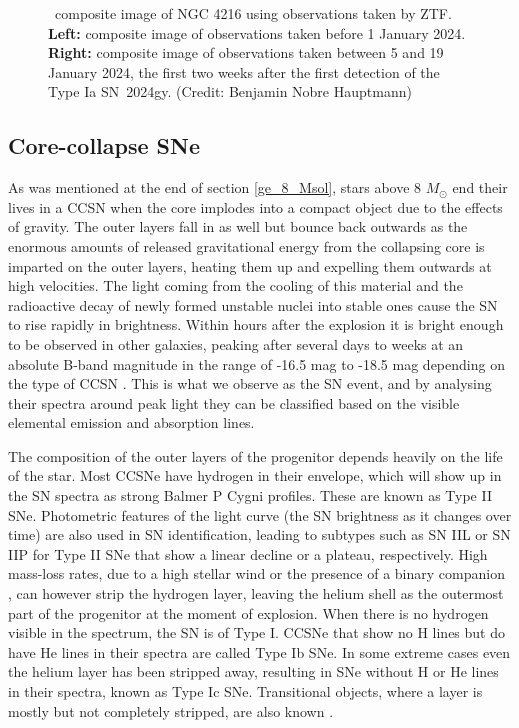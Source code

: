 \documentclass[a4paper,oneside,12pt, class=Latex/Classes/PhDthesisPSnPDF, crop=false]{standalone}
\begin{document}
\begin{figure}
    \caption[\ztfg\ztfr\ztfi\ composite image of NGC 4216 using observations taken by ZTF.]{\ztfg\ztfr\ztfi\ composite image of NGC 4216 using observations taken by ZTF.\\
    \textbf{Left:} composite image of observations taken before 1 January 2024.\\
    \textbf{Right:} composite image of observations taken between 5 and 19 January 2024, the first two weeks after the first detection of the Type Ia SN~2024gy. (Credit: Benjamin Nobre Hauptmann)} %
    \label{2024gy_ZTF}
\end{figure}


\subsection{Core-collapse SNe}
\label{CCSN}
As was mentioned at the end of section \ref{ge_8_Msol}, stars above 8 $M_\odot$ end their lives in a CCSN when the core implodes into a compact object due to the effects of gravity. The outer layers fall in as well but bounce back outwards as the enormous amounts of released gravitational energy from the collapsing core is imparted on the outer layers, heating them up and expelling them outwards at high velocities. The light coming from the cooling of this material and the radioactive decay of newly formed unstable nuclei into stable ones cause the SN to rise rapidly in brightness. Within hours after the explosion it is bright enough to be observed in other galaxies, peaking after several days to weeks at an absolute B-band magnitude in the range of -16.5 mag to -18.5 mag depending on the type of CCSN \citep{SN_M_dist}. This is what we observe as the SN event, and by analysing their spectra around peak light they can be classified based on the visible elemental emission and absorption lines.

The composition of the outer layers of the progenitor depends heavily on the life of the star. Most CCSNe have hydrogen in their envelope, which will show up in the SN spectra as strong Balmer P Cygni profiles. These are known as Type II SNe. Photometric features of the light curve (the SN brightness as it changes over time) are also used in SN identification, leading to subtypes such as SN IIL or SN IIP for Type II SNe that show a linear decline or a plateau, respectively. High mass-loss rates, due to a high stellar wind \citep{He-star_pre_SN_evol_mass_loss} or the presence of a binary companion \citep{He-star_pre_SN_evol_binaries}, can however strip the hydrogen layer, leaving the helium shell as the outermost part of the progenitor at the moment of explosion. When there is no hydrogen visible in the spectrum, the SN is of Type I. CCSNe that show no H lines but do have He lines in their spectra are called Type Ib SNe. In some extreme cases even the helium layer has been stripped away, resulting in SNe without H or He lines in their spectra, known as Type Ic SNe. Transitional objects, where a layer is mostly but not completely stripped, are also known \citep{SN_large_pic}.\\
\end{document}
